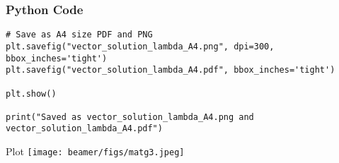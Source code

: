 \documentclass{beamer}
\begin{document}
\begin{frame}[fragile]
    \frametitle{Python Code}
    \begin{lstlisting}
# Save as A4 size PDF and PNG
plt.savefig("vector_solution_lambda_A4.png", dpi=300, bbox_inches='tight')
plt.savefig("vector_solution_lambda_A4.pdf", bbox_inches='tight')

plt.show()

print("Saved as vector_solution_lambda_A4.png and vector_solution_lambda_A4.pdf")
    \end{lstlisting}
\end{frame}

\begin{frame}{Plot}
    \centering
    \texttt{[image: beamer/figs/matg3.jpeg]}     
\end{frame}
\end{document}
